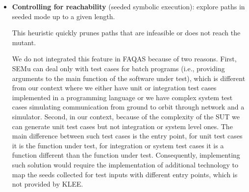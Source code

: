 \begin{itemize}
	\item \textbf{Controlling for reachability} (seeded symbolic execution): explore paths in seeded  mode up to a given length. 
	
	This heuristic quickly prunes paths that are infeasible or does not reach the mutant. 
	
	
	We do not integrated this feature in FAQAS because of two reasons. First, SEMu can deal only with test cases for batch programs (i.e., providing arguments to the main function of the software under test), which is different from our context where we either have unit or integration test cases implemented in a programming language or we have complex system test cases simulating communication from ground to orbit through network and a simulator. Second, in our context, because of the complexity of the SUT we can generate unit test cases but not integration or system level ones. The main difference between such test cases is the entry point, for unit test cases it is the function under test, for integration or system test cases it is a function different than the function under test. Consequently, implementing such solution would require the implementation of additional technology to map the seeds collected for test inputs with different entry points, which is not provided by KLEE.


\end{itemize}

